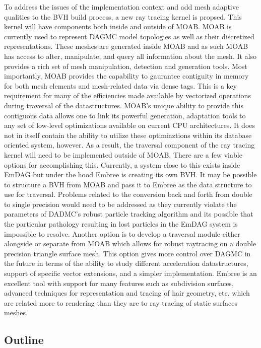 \documentclass[10pt, a4paper]{article}
\begin{document}
To address the issues of the implementation context and add mesh adaptive qualities to the BVH build process, a new ray tracing kernel is propsed. This kernel will have components both inside and outside of MOAB. MOAB is currently used to represent DAGMC model topologies as well as their discretized representations. These meshes are generated inside MOAB and as such MOAB has access to alter, manipulate, and query all information about the mesh. It also provides a rich set of mesh manipulation, detection and generation tools. Most importantly, MOAB provides the capability to gaurantee contiguity in memory for both mesh elements and mesh-related data via dense tags. This is a key requirement for many of the efficiencies made available by vectorized operations during traversal of the datastructures. MOAB's unique ability to provide this contiguous data allows one to link its powerful generation, adaptation tools to any set of low-level optimizations available on current CPU architectures. It does not in itself contain the ability to utilize these optimiaztions within its database oriented system, however. As a result, the traversal component of the ray tracing kernel will need to be implemented outside of MOAB. There are a few viable options for accomplishing this. Currently, a system close to this exists inside EmDAG but under the hood Embree is creating its own BVH. It may be possible to structure a BVH from MOAB and pass it to Embree as the data structure to use for traversal. Problems related to the conversion back and forth from double to single precision would need to be addressed as they currently violate the parameters of DADMC's robust particle tracking algorithm and its possible that the particular pathology resulting in lost particles in the EmDAG system is impossible to resolve. Another option is to develop a traversal module either alongside or separate from MOAB which allows for robust raytracing on a double precision triangle surface mesh. This option gives more control over DAGMC in the future in terms of the ability to study different acceleration datastructures, support of specific vector extensions, and a simpler implementation. Embree is an excellent tool with support for many features such as subdivision surfaces, advanced techniques for representation and tracing of hair geometry, etc. which are related more to rendering than they are to ray tracing of static surfaces meshes. 


\subsection{Outline}
\end{document}
